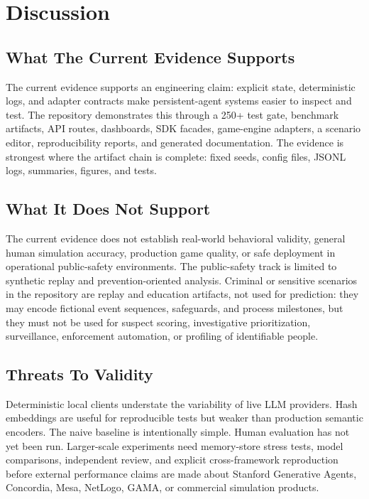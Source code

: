 \section{Discussion}

\subsection{What The Current Evidence Supports}

The current evidence supports an engineering claim: explicit state, deterministic logs, and adapter contracts make persistent-agent systems easier to inspect and test. The repository demonstrates this through a 250+ test gate, benchmark artifacts, API routes, dashboards, SDK facades, game-engine adapters, a scenario editor, reproducibility reports, and generated documentation. The evidence is strongest where the artifact chain is complete: fixed seeds, config files, JSONL logs, summaries, figures, and tests.

\subsection{What It Does Not Support}

The current evidence does not establish real-world behavioral validity, general human simulation accuracy, production game quality, or safe deployment in operational public-safety environments. The public-safety track is limited to synthetic replay and prevention-oriented analysis. Criminal or sensitive scenarios in the repository are replay and education artifacts, not used for prediction: they may encode fictional event sequences, safeguards, and process milestones, but they must not be used for suspect scoring, investigative prioritization, surveillance, enforcement automation, or profiling of identifiable people.

\subsection{Threats To Validity}

Deterministic local clients understate the variability of live LLM providers. Hash embeddings are useful for reproducible tests but weaker than production semantic encoders. The naive baseline is intentionally simple. Human evaluation has not yet been run. Larger-scale experiments need memory-store stress tests, model comparisons, independent review, and explicit cross-framework reproduction before external performance claims are made about Stanford Generative Agents, Concordia, Mesa, NetLogo, GAMA, or commercial simulation products.

